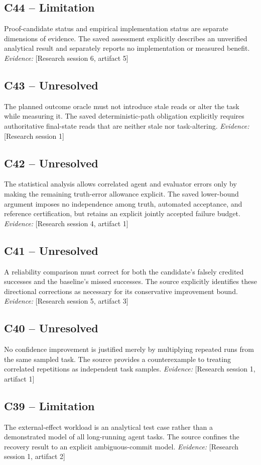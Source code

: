 \documentclass[11pt]{article}
\begin{document}
\begin{sloppypar}
\subsection{C44 -- Limitation}
Proof-candidate status and empirical implementation status are separate dimensions of evidence.
The saved assessment explicitly describes an unverified analytical result and separately reports no implementation or measured benefit.
\textit{Evidence: }[Research session 6, artifact 5]
\subsection{C43 -- Unresolved}
The planned outcome oracle must not introduce stale reads or alter the task while measuring it.
The saved deterministic-path obligation explicitly requires authoritative final-state reads that are neither stale nor task-altering.
\textit{Evidence: }[Research session 1]
\subsection{C42 -- Unresolved}
The statistical analysis allows correlated agent and evaluator errors only by making the remaining truth-error allowance explicit.
The saved lower-bound argument imposes no independence among truth, automated acceptance, and reference certification, but retains an explicit jointly accepted failure budget.
\textit{Evidence: }[Research session 4, artifact 1]
\subsection{C41 -- Unresolved}
A reliability comparison must correct for both the candidate's falsely credited successes and the baseline's missed successes.
The source explicitly identifies these directional corrections as necessary for its conservative improvement bound.
\textit{Evidence: }[Research session 5, artifact 3]
\subsection{C40 -- Unresolved}
No confidence improvement is justified merely by multiplying repeated runs from the same sampled task.
The source provides a counterexample to treating correlated repetitions as independent task samples.
\textit{Evidence: }[Research session 1, artifact 1]
\subsection{C39 -- Limitation}
The external-effect workload is an analytical test case rather than a demonstrated model of all long-running agent tasks.
The source confines the recovery result to an explicit ambiguous-commit model.
\textit{Evidence: }[Research session 1, artifact 2]

\end{sloppypar}
\end{document}
